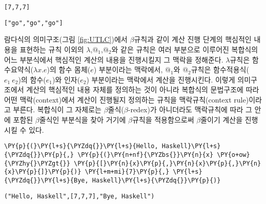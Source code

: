     
    \begin{Verbatim}[commandchars=\\\{\}]
[7,7,7]
    \end{Verbatim}

    
    
    \begin{Verbatim}[commandchars=\\\{\}]
["go","go","go"]
    \end{Verbatim}

    
    \vspace*{1ex}

람다식의 의미구조(그림 \ref{fig:UTLC})에서 \(\beta\)규칙과 같이 계산
진행 단계의 핵심적인 내용을 표현하는 규칙 이외의
\(\lambda\),\(\textrm{@}_1\),\(\textrm{@}_2\)와 같은 규칙은 여러
부분으로 이루어진 복합식의 어느 부분식에서 핵심적인 계산의 내용을
진행시킬지 그 맥락을 정해준다. \(\lambda\)규칙은
함수요약식(\(\lambda x.e\))의 함수 몸체(\(e\)) 부분이라는 맥락에서,
\(\textrm{@}_1\)와 \(\textrm{@}_2\)규칙은 함수적용식(\(e_1~e_2\))의
함수(\(e_1\))와 인자(\(e_2\)) 부분이라는 맥락에서 계산을 진행시킨다.
이렇게 의미구조에서 계산의 핵심적인 내용 자체를 정의하는 것이 아니라
복합식의 문법구조에 따라 어떤 맥락(context)에서 계산이 진행될지 정의하는
규칙을 맥락규칙(context rule)이라고 부른다. 복합식이 그 자체로는
\(\beta\)줄식(\(\beta\)-redex)가 아니더라도 맥락규칙에 따라 그 안에
포함된 \(\beta\)줄식인 부분식을 찾아 거기에 \(\beta\)규칙을 적용함으로써
\(\beta\)줄이기 계산을 진행시킬 수 있다.

    \begin{tcolorbox}[breakable, size=fbox, boxrule=1pt, pad at break*=1mm,colback=cellbackground, colframe=cellborder, top=.75ex]
\begin{Verbatim}[commandchars=\\\{\}]
\PY{p}{(}\PY{l+s}{\PYZdq{}}\PY{l+s}{Hello, Haskell}\PY{l+s}{\PYZdq{}}\PY{p}{,} \PY{p}{(}\PY{n+nf}{\PYZbs{}}\PY{n}{x} \PY{o+ow}{\PYZhy{}\PYZgt{}} \PY{p}{[}\PY{n}{x}\PY{p}{,}\PY{n}{x}\PY{p}{,}\PY{n}{x}\PY{p}{]}\PY{p}{)} \PY{l+m+mi}{7}\PY{p}{,} \PY{l+s}{\PYZdq{}}\PY{l+s}{Bye, Haskell}\PY{l+s}{\PYZdq{}}\PY{p}{)}
\end{Verbatim}
\end{tcolorbox}

    
    \begin{Verbatim}[commandchars=\\\{\}]
("Hello, Haskell",[7,7,7],"Bye, Haskell")
    \end{Verbatim}

